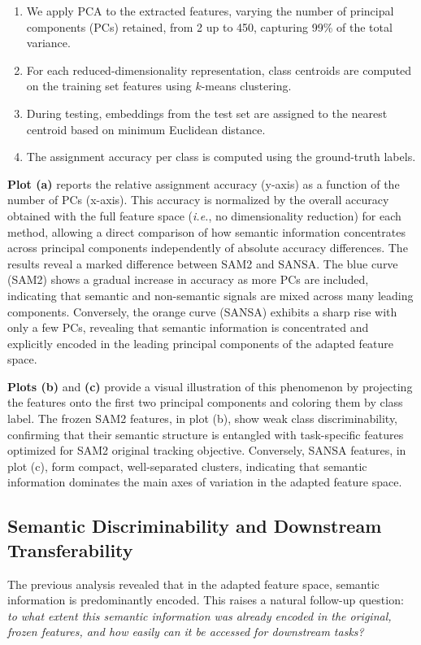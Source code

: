 \begin{enumerate}
    \item We apply PCA to the extracted features, varying the number of principal components (PCs) retained, from 2 up to 450, capturing 99\% of the total variance.
    \item For each reduced-dimensionality representation, class centroids are computed on the training set features using $k$-means clustering.
    \item During testing, embeddings from the test set are assigned to the nearest centroid based on minimum Euclidean distance.
    \item The assignment accuracy per class is computed using the ground-truth labels.
\end{enumerate}

\textbf{Plot (a)} reports the relative assignment accuracy (y-axis) as a function of the number of PCs (x-axis). This accuracy is normalized by the overall accuracy obtained with the full feature space (\textit{i.e.}, no dimensionality reduction) for each method, allowing a direct comparison of how semantic information concentrates across principal components independently of absolute accuracy differences.
The results reveal a marked difference between SAM2 and SANSA. The blue curve (SAM2) shows a gradual increase in accuracy as more PCs are included, indicating that semantic and non-semantic signals are mixed across many leading components. Conversely, the orange curve (SANSA) exhibits a sharp rise with only a few PCs, revealing that semantic information is concentrated and explicitly encoded in the leading principal components of the adapted feature space.




\textbf{Plots (b)} and \textbf{(c)} provide a visual illustration of this phenomenon by projecting the features onto the first two principal components and coloring them by class label. The frozen SAM2 features, in plot (b), show weak class discriminability, confirming that their semantic structure is entangled with task-specific features optimized for SAM2 original tracking objective. Conversely, SANSA features, in plot (c), form compact, well-separated clusters, indicating that semantic information dominates the main axes of variation in the adapted feature space.


\subsection{Semantic Discriminability and Downstream Transferability}
The previous analysis revealed that in the adapted \ours{} feature space, semantic information is predominantly encoded. This raises a natural follow-up question: \textit{to what extent this semantic information was already encoded in the original, frozen \sam{} features, and how easily can it be accessed for downstream tasks?}


